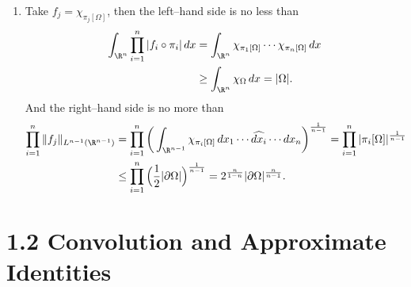 \begin{enumerate}
\begin{enumerate}
   \item[(b)] Take $f_{j}=\chi_{\pi_{j}[\Omega]}$, 
   then the left--hand side is no less than
   \begin{equation*}\begin{aligned}
   \int_{\R^{n}}\prod_{i=1}^{n}|f_{i}\circ \pi_{i}|\,dx 
   &=\int_{\R^{n}}\chi_{\pi_{1}[\Omega]}\cdots\chi_{\pi_{n}[\Omega]} \,dx\\
   &\geq\int_{\R^{n}}\chi_{\Omega}\,dx = |\Omega|.
   \end{aligned}\end{equation*}
   And the right--hand side is no more than
   \begin{equation*}\begin{aligned}
   \prod_{i=1}^{n}\norm{f_{j}}_{L^{n-1}(\R^{n-1})} 
   &= \prod_{i=1}^{n} \bigg(\int_{\R^{n-1}}\chi_{\pi_{i}[\Omega]}
   \,dx_{1}\cdots  \widehat{dx_{i}} \cdots dx_{n}\bigg)^{\frac{1}{n-1}} 
   = \prod_{i=1}^{n}|\pi_{i}[\Omega]|^{\frac{1}{n-1}} \\
   &\leq \prod_{i=1}^{n}\Big(\frac{1}{2}|\partial\Omega|\Big)^{\frac{1}{n-1}} 
   = 2^{\frac{n}{1-n}}|\partial\Omega|^{\frac{n}{n-1}}.
   \end{aligned}\end{equation*}
   \end{enumerate}
\end{enumerate}

\section*{1.2 Convolution and Approximate Identities}

